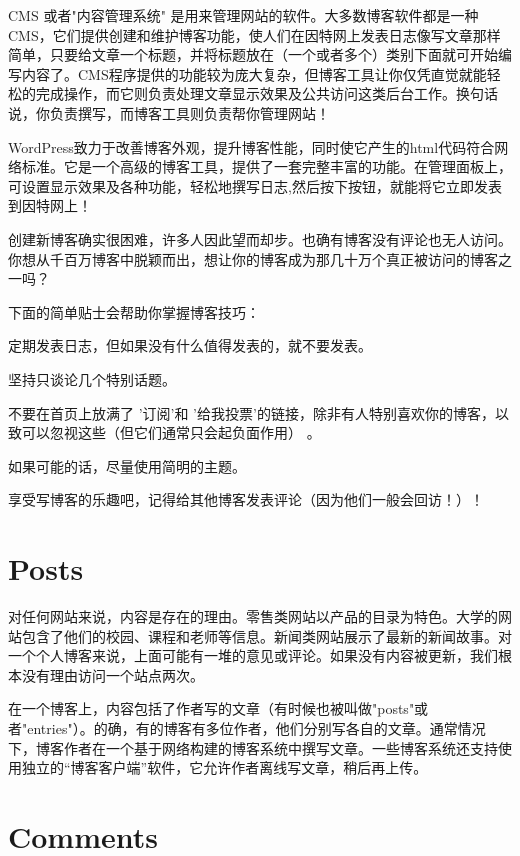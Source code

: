 CMS 或者"内容管理系统" 是用来管理网站的软件。大多数博客软件都是一种CMS，它们提供创建和维护博客功能，使人们在因特网上发表日志像写文章那样简单，只要给文章一个标题，并将标题放在（一个或者多个）类别下面就可开始编写内容了。CMS程序提供的功能较为庞大复杂，但博客工具让你仅凭直觉就能轻松的完成操作，而它则负责处理文章显示效果及公共访问这类后台工作。换句话说，你负责撰写，而博客工具则负责帮你管理网站！

WordPress致力于改善博客外观，提升博客性能，同时使它产生的html代码符合网络标准。它是一个高级的博客工具，提供了一套完整丰富的功能。在管理面板上，可设置显示效果及各种功能，轻松地撰写日志,然后按下按钮，就能将它立即发表到因特网上！

创建新博客确实很困难，许多人因此望而却步。也确有博客没有评论也无人访问。你想从千百万博客中脱颖而出，想让你的博客成为那几十万个真正被访问的博客之一吗？

下面的简单贴士会帮助你掌握博客技巧：

\begin{compactenum}
\item 定期发表日志，但如果没有什么值得发表的，就不要发表。
\item 坚持只谈论几个特别话题。
\item 不要在首页上放满了 '订阅'和 '给我投票'的链接，除非有人特别喜欢你的博客，以致可以忽视这些（但它们通常只会起负面作用） 。
\item 如果可能的话，尽量使用简明的主题。
\item 享受写博客的乐趣吧，记得给其他博客发表评论（因为他们一般会回访！）！
\end{compactenum}

\section{Posts}

对任何网站来说，内容是存在的理由。零售类网站以产品的目录为特色。大学的网站包含了他们的校园、课程和老师等信息。新闻类网站展示了最新的新闻故事。对一个个人博客来说，上面可能有一堆的意见或评论。如果没有内容被更新，我们根本没有理由访问一个站点两次。

在一个博客上，内容包括了作者写的文章（有时候也被叫做"posts"或者"entries"）。的确，有的博客有多位作者，他们分别写各自的文章。通常情况下，博客作者在一个基于网络构建的博客系统中撰写文章。一些博客系统还支持使用独立的“博客客户端”软件，它允许作者离线写文章，稍后再上传。

\section{Comments}



